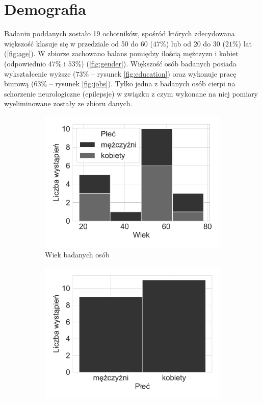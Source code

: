 \documentclass{./assets/wfis}
\begin{document}
\section{Demografia}
Badaniu poddanych zostało 19 ochotników, spośród których zdecydowana większość klasuje się w przedziale od 50 do 60 ($47\%$) lub od 20 do 30 ($21\%$) lat (\autoref{fig:age}). W zbiorze zachowano balans pomiędzy ilością mężczyzn i kobiet (odpowiednio $47\%$ i $53\%$) (\autoref{fig:gender}). Większość osób badanych posiada wykształcenie wyższe ($73\%$ – rysunek \ref{fig:education}) oraz wykonuje pracę biurową ($63\%$ – rysunek \ref{fig:jobs}). Tylko jedna z badanych osób cierpi na schorzenie neurologiczne (epilepsje) w związku z czym wykonane na niej pomiary  wyeliminowane zostały ze zbioru danych.

\begin{figure}[h!]
\begin{subfigure}[b]{0.45\textwidth}
    \centering
    \includegraphics[width=\columnwidth]{plots/age.pdf}
    \caption{Wiek badanych osób}
    \label{fig:age}
\end{subfigure}   
\hfill
\begin{subfigure}[b]{0.45\textwidth}
    \centering
    \includegraphics[width=\columnwidth]{plots/gender.pdf}

\end{subfigure}
\end{figure}
\end{document}
